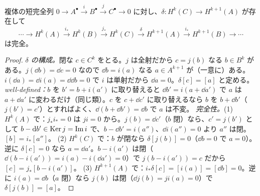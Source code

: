 \begin{lem}[蛇の補題]\label{B:lem:snake}\tP
複体の短完全列 $0\to A^\bullet\xrightarrow{i}B^\bullet\xrightarrow{j}C^\bullet\to0$ に対し、$\delta:H^k(C)\to H^{k+1}(A)$ が存在して
\[
\cdots\to H^k(A)\xrightarrow{i_*}H^k(B)\xrightarrow{j_*}H^k(C)\xrightarrow{\ \delta\ }H^{k+1}(A)\xrightarrow{i_*}H^{k+1}(B)\to\cdots
\]
は完全。
\end{lem}
\begin{proof}
\emph{$\delta$ の構成。}閉な $c\in C^k$ をとる。$j$ は全射だから $c=j(b)$ なる $b\in B^k$ がある。$j(\dd b)=\dd c=0$ なので $\dd b=i(a)$ なる $a\in A^{k+1}$ が（一意に）ある。$i(\dd a)=\dd i(a)=\dd\dd b=0$ で $i$ は単射だから $\dd a=0$。$\delta[c]=[a]$ と定める。
\emph{well-defined：}$b$ を $b'=b+i(a')$ に取り替えると $\dd b'=i(a+\dd a')$ で $a$ は $a+\dd a'$ に変わるだけ（同じ類）。$c$ を $c+\dd c'$ に取り替えるなら $b$ を $b+\dd b'$（$j(b')=c'$）とすればよく、$\dd(b+\dd b')=\dd b$ で $a$ は不変。
\emph{完全性。}(1) $H^k(A)$ で：$j_*i_*=0$ は $ji=0$ から。$j(b)=\dd c'$（$b$ 閉）なら、$c'=j(b')$ として $b-\mathrm{d} b'\in\operatorname{Ker} j=\operatorname{Im} i$ で、$b-\dd b'=i(a'')$、$\dd i(a'')=0$ より $a''$ は閉。$[b]=i_*[a'']$。
(2) $H^k(C)$ で：$b$ が閉なら $\delta[j(b)]=0$（$\dd b=0$ で $a=0$）。逆に $\delta[c]=0$ なら $a=\dd a'$。$b-i(a')$ は閉（$\dd(b-i(a'))=i(a)-i(\dd a')=0$）で $j(b-i(a'))=c$ だから $[c]=j_*[b-i(a')]$。
(3) $H^{k+1}(A)$ で：$i_*\delta[c]=[i(a)]=[\dd b]=0$。逆に $i(a)=\dd b$（$a$ 閉）なら $j(b)$ は閉（$\dd j(b)=ji(a)=0$）で $\delta[j(b)]=[a]$。
\end{proof}

